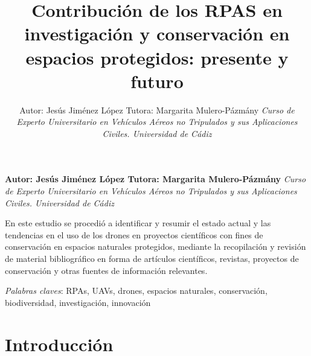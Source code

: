 \documentclass[9t,twocolumn]{article}
\title{Contribución de los RPAS en investigación y conservación en espacios
protegidos: presente y futuro  }
\author{\Large Autor: Jesús Jiménez López Tutora: Margarita Mulero-Pázmány\vspace{0.05in} \newline\normalsize\emph{Curso de Experto Universitario en Vehículos Aéreos no Tripulados y sus
Aplicaciones Civiles. Universidad de Cádiz}  }
\date{}
\newcommand*{\authorfont}{\fontfamily{phv}\selectfont}
\renewenvironment{abstract}
 {{%
    \setlength{\leftmargin}{0mm}
    \setlength{\rightmargin}{\leftmargin}%
  }%
  \relax}
 {\endlist}
\begin{document}
	
%

{%
\setlength{\parindent}{0pt}
\thispagestyle{plain}
{\fontsize{10}{12}\selectfont\raggedright 
\maketitle  %

}

{
   \vskip 13.5pt\relax \normalsize\fontsize{10}{12} 
\textbf{\authorfont Autor: Jesús Jiménez López Tutora: Margarita Mulero-Pázmány} \hskip 15pt \vskip 8.5pt  \emph{\small Curso de Experto Universitario en Vehículos Aéreos no Tripulados y sus
Aplicaciones Civiles. Universidad de Cádiz}   

}

}






\begin{abstract}

    \hbox{\vrule height .2pt width 39.14pc}

    \vskip 8.5pt %

\noindent En este estudio se procedió a identificar y resumir el estado actual y
las tendencias en el uso de los drones en proyectos científicos con
fines de conservación en espacios naturales protegidos, mediante la
recopilación y revisión de material bibliográfico en forma de artículos
científicos, revistas, proyectos de conservación y otras fuentes de
información relevantes.


\vskip 8.5pt \noindent \emph{Palabras claves}: RPAs, UAVs, drones, espacios naturales, conservación, biodiversidad,
investigación, innovación \par

    \hbox{\vrule height .2pt width 39.14pc}



\end{abstract}


{
\hypersetup{linkcolor=black}
\setcounter{tocdepth}{2}
\tableofcontents
}


\vskip 6.5pt

\noindent \doublespacing \section{Introducción}\label{introduccion}
\end{document}
